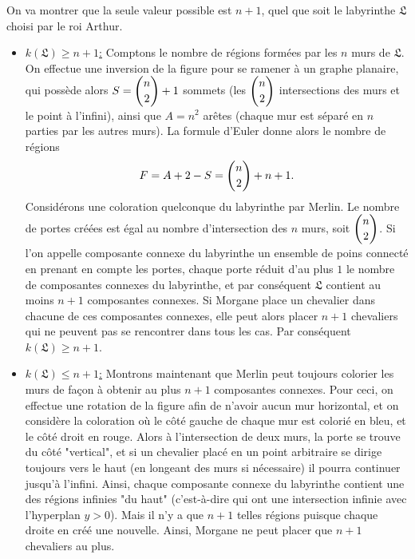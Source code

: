 \begin{sol}
On va montrer que la seule valeur possible est $n+1$, quel que soit le labyrinthe $\mathfrak{L}$ choisi par le roi Arthur.

\begin{itemize}
    \item \underline{$k(\mathfrak{L})\ge n+1$:} Comptons le nombre de régions formées par les $n$ murs de $\mathfrak{L}$. On effectue une inversion de la figure pour se ramener à un graphe planaire, qui possède alors $S = \dbinom n2 + 1$ sommets (les $\dbinom n2$ intersections des murs et le point à l'infini), ainsi que $A = n^2$ arêtes (chaque mur est séparé en $n$ parties par les autres murs). La formule d'Euler donne alors le nombre de régions
    $$F = A + 2 - S = \dbinom n2 + n + 1.$$
    Considérons une coloration quelconque du labyrinthe par Merlin. Le nombre de portes créées est égal au nombre d'intersection des $n$ murs, soit $\dbinom n2$. Si l'on appelle composante connexe du labyrinthe un ensemble de poins connecté en prenant en compte les portes, chaque porte réduit d'au plus $1$ le nombre de composantes connexes du labyrinthe, et par conséquent $\mathfrak{L}$ contient au moins $n+1$ composantes connexes. Si Morgane place un chevalier dans chacune de ces composantes connexes, elle peut alors placer $n+1$ chevaliers qui ne peuvent pas se rencontrer dans tous les cas. Par conséquent $k(\mathfrak{L})\ge n+1$.
    
    \item \underline{$k(\mathfrak{L})\le n+1$:} Montrons maintenant que Merlin peut toujours colorier les murs de façon à obtenir au plus $n+1$ composantes connexes. Pour ceci, on effectue une rotation de la figure afin de n'avoir aucun mur horizontal, et on considère la coloration où le côté gauche de chaque mur est colorié en bleu, et le côté droit en rouge. Alors à l'intersection de deux murs, la porte se trouve du côté "vertical", et si un chevalier placé en un point arbitraire se dirige toujours vers le haut (en longeant des murs si nécessaire) il pourra continuer jusqu'à l'infini. Ainsi, chaque composante connexe du labyrinthe contient une des régions infinies "du haut" (c'est-à-dire qui ont une intersection infinie avec l'hyperplan $y>0$). Mais il n'y a que $n+1$ telles régions puisque chaque droite en créé une nouvelle. Ainsi, Morgane ne peut placer que $n+1$ chevaliers au plus.
\end{itemize}
\end{sol}

